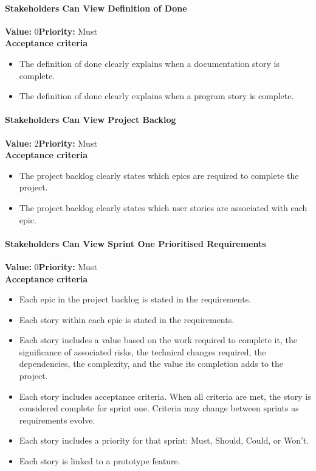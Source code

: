\paragraph{Stakeholders Can View Definition of Done}
\textbf{Value:} 0\quad \textbf{Priority:} Must\\
\textbf{Acceptance criteria}
\begin{itemize}
  \item The definition of done clearly explains when a documentation story is complete.
  \item The definition of done clearly explains when a program story is complete.
\end{itemize}

\paragraph{Stakeholders Can View Project Backlog}
\textbf{Value:} 2\quad \textbf{Priority:} Must\\
\textbf{Acceptance criteria}
\begin{itemize}
  \item The project backlog clearly states which epics are required to complete the project.
  \item The project backlog clearly states which user stories are associated with each epic.
\end{itemize}

\paragraph{Stakeholders Can View Sprint One Prioritised Requirements}
\textbf{Value:} 0\quad \textbf{Priority:} Must\\
\textbf{Acceptance criteria}
\begin{itemize}
  \item Each epic in the project backlog is stated in the requirements.
  \item Each story within each epic is stated in the requirements.
  \item Each story includes a value based on the work required to complete it, the significance of associated risks, the technical changes required, the dependencies, the complexity, and the value its completion adds to the project.
  \item Each story includes acceptance criteria. When all criteria are met, the story is considered complete for sprint one. Criteria may change between sprints as requirements evolve.
  \item Each story includes a priority for that sprint: Must, Should, Could, or Won't.
  \item Each story is linked to a prototype feature.
\end{itemize}

